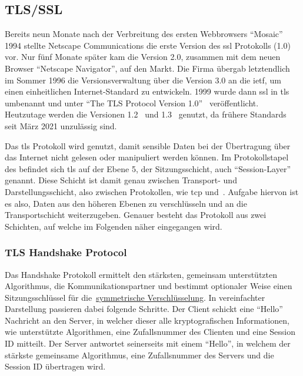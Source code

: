 \subsection{TLS/SSL}\label{subsec:ssl}
	Bereits neun Monate nach der Verbreitung des ersten Webbrowsers \enquote{Mosaic} 1994
	stellte Netscape Communications die erste Version des \gls{ssl} Protokolls (1.0) vor.
	Nur fünf Monate später kam die Version 2.0,
	zusammen mit dem neuen Browser \enquote{Netscape Navigator},
	auf den Markt.
	Die Firma übergab letztendlich im Sommer 1996 die Versionsverwaltung über die Version 3.0 an die \gls{ietf},
	um einen einheitlichen Internet-Standard zu entwickeln.
	1999 wurde dann \gls{ssl} in \gls{tls} umbenannt und
	unter \enquote{The TLS Protocol Version 1.0}~\cite[Vgl.][]{rfc2246} veröffentlicht.
	Heutzutage werden die Versionen 1.2~\cite[Vgl.][]{rfc5246} und 1.3~\cite[Vgl.][]{rfc8446} genutzt,
	da frühere Standards seit März 2021 unzulässig sind. \par
	Das \gls{tls} Protokoll wird genutzt,
	damit sensible Daten bei der Übertragung über das Internet nicht gelesen oder manipuliert werden können.
	Im Protokollstapel des 
	befindet sich \gls{tls} auf der Ebene 5,
	der Sitzungsschicht, auch \enquote{Session-Layer} genannt.
	Diese Schicht ist damit genau zwischen Transport- und Darstellungsschicht,
	also zwischen Protokollen, wie \gls{tcp} und~.
	Aufgabe hiervon ist es also,
	Daten aus den höheren Ebenen zu verschlüsseln und an die Transportschicht weiterzugeben.
	Genauer besteht das Protokoll aus zwei Schichten,
	auf welche im Folgenden näher eingegangen wird.

	\subsubsection{TLS Handshake Protocol}\label{subsubsec:tlsHandshake}
		Das Handshake Protokoll ermittelt den stärksten,
		gemeinsam unterstützten Algorithmus,
		 die Kommunikationspartner
		und bestimmt optionaler Weise einen Sitzungsschlüssel für
		die~\hyperref[subsubsec:symVersch]{symmetrische Verschlüsselung}.
		In vereinfachter Darstellung passieren dabei folgende Schritte.
		Der Client schickt eine \enquote{Hello} Nachricht an den Server,
		in welcher dieser alle kryptografischen Informationen,
		wie unterstützte Algorithmen,
		eine Zufallsnummer des Clienten und eine Session ID mitteilt.
		Der Server antwortet seinerseits mit einem \enquote{Hello},
		in welchem der stärkste gemeinsame Algorithmus,
		eine Zufallsnummer des Servers und die Session ID übertragen wird.

